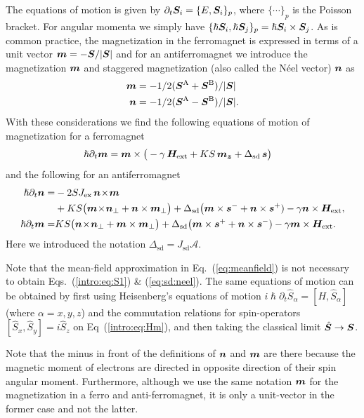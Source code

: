 The equations of motion is given by $\partial_t \boldsymbol{S}_i = \{E,\boldsymbol{S}_i\}_p$, where $\{\cdots\}_p$ is the Poisson bracket. For angular momenta we simply have $\{\hslash \boldsymbol{S}_i,\hslash \boldsymbol{S}_j\}_p=\hslash \boldsymbol{S}_i\times\boldsymbol{S}_j$. As is common practice, the magnetization in the ferromagnet is expressed in terms of a unit vector $\boldsymbol{m} = -\boldsymbol{S}/|\boldsymbol{S}|$ and for an antiferromagnet we introduce the magnetization $\boldsymbol{m}$ and staggered magnetization (also called the N\'eel vector) $\boldsymbol{n}$ as
\begin{align}
 	\boldsymbol{m} & =-1/2(\boldsymbol{S}^\text{A}+\boldsymbol{S}^\text{B})/|\boldsymbol{S}|\\
    \boldsymbol{n} & =-1/2(\boldsymbol{S}^\text{A}-\boldsymbol{S}^\text{B})/|\boldsymbol{S}|.
\end{align} 
With these considerations we find the following equations of motion of magnetization for a ferromagnet
\begin{align}
	\hslash \partial_t \boldsymbol{m}  & = \boldsymbol{m}\times\big(-\gamma\,\boldsymbol{H}_\text{ext}+KS \,\boldsymbol{m_z}+\Delta_\text{sd}\,\boldsymbol{s}\big)
	\label{intro:eq:S1}
\end{align}
and the following for an antiferromagnet
\begin{align}
\hslash \partial_t \boldsymbol{n} = &  -2SJ_\text{ex}\, \boldsymbol{n}\!\times\!\boldsymbol{m} \nonumber\\
     &  + KS \big(\boldsymbol{m}\!\times\!\boldsymbol{n}_\perp+\boldsymbol{n}\times\boldsymbol{m}_\perp\big) 
	+ \Delta_\text{sd} \big(\boldsymbol{m}\times\boldsymbol{s}^-+\boldsymbol{n}\times\boldsymbol{s}^+) -\gamma\boldsymbol{n}\times\boldsymbol{H}_\text{ext},\\
\hslash \partial_t \boldsymbol{m} = & KS  \big(\boldsymbol{n}\!\times\!\boldsymbol{n}_\perp+\boldsymbol{m}\times\boldsymbol{m}_\perp\big) 
	+ \Delta_\text{sd} \big(\boldsymbol{m}\times\boldsymbol{s}^++\boldsymbol{n}\times\boldsymbol{s}^-)-\gamma \boldsymbol{m}\times\boldsymbol{H}_\text{ext}.
	\label{eq:sd:neel}
\end{align}
Here we introduced the notation $\Delta_\text{sd} = J_\text{sd}\mathcal{A}$. 

Note that the mean-field approximation in Eq.~(\ref{eq:meanfield}) is not necessary to obtain Eqs.~(\ref{intro:eq:S1}) \& (\ref{eq:sd:neel}). The same equations of motion can be obtained by first using Heisenberg's equations of motion $i \hslash\partial_t \hat{S}_\alpha = [H,\hat{S}_\alpha]$ (where $\alpha=x,y,z$) and the commutation relations for spin-operators $[\hat{S}_x, \hat{S}_y]=i\hat{S}_z$ on Eq~(\ref{intro:eq:Hm}), and then taking the classical limit $\hat{\boldsymbol{S}}\rightarrow \boldsymbol{S}$. 

Note that the minus in front of the definitions of $\boldsymbol{n}$ and $\boldsymbol{m}$ are there because the magnetic moment of electrons are directed in opposite direction of their spin angular moment. Furthermore, although we use the same notation $\boldsymbol{m}$ for the magnetization in a ferro and anti-ferromagnet, it is only a unit-vector in the former case and not the latter. 

